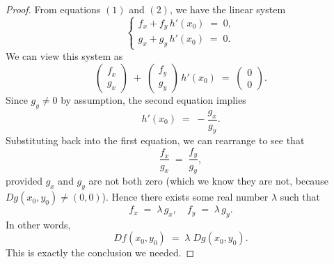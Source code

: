 \documentclass[11pt]{article}
\begin{document}
\begin{exercise}{1}
\begin{proof}
From equations \((1)\) and \((2)\), we have the linear system
\[
\begin{cases}
f_x + f_y\,h'(x_0)\;=\;0, \\
g_x + g_y\,h'(x_0)\;=\;0.
\end{cases}
\]
We can view this system as
\[
\begin{pmatrix}f_x \\ g_x\end{pmatrix}
\;+\;
\begin{pmatrix}f_y \\ g_y\end{pmatrix}\,h'(x_0)
\;=\;
\begin{pmatrix}0 \\ 0\end{pmatrix}.
\]
Since \(g_y \neq 0\) by assumption, the second equation implies
\[
h'(x_0) \;=\; -\frac{g_x}{g_y}.
\]
Substituting back into the first equation, we can rearrange to see that
\[
\frac{f_x}{g_x}
\;=\;
\frac{f_y}{g_y},
\]
provided \(g_x\) and \(g_y\) are not both zero (which we know they are not, because \(D g(x_0,y_0)\neq (0,0)\)).  Hence there exists some real number \(\lambda\) such that
\[
f_x \;=\;\lambda\,g_x,
\quad
f_y \;=\;\lambda\,g_y.
\]
In other words,
\[
D f(x_0,y_0)
\;=\;
\lambda\;D g(x_0,y_0).
\]
This is exactly the conclusion we needed.
\end{proof}
\end{exercise}
\end{document}
